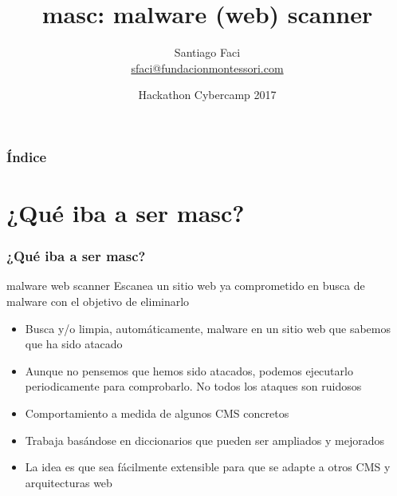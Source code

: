 \documentclass[xcolor={dvipsnames}]{beamer}
\begin{document}
\title{masc: malware (web) scanner}  
\author{Santiago Faci\\ \url{sfaci@fundacionmontessori.com}}
\date{\Large{Hackathon Cybercamp 2017}} 

\begin{frame}
\titlepage
\end{frame}

\begin{frame}[plain]\frametitle{Índice}\tableofcontents
\end{frame} 


\section{¿Qué iba a ser masc?} 
\begin{frame}\frametitle{¿Qué iba a ser masc?} 

    \begin{block}{malware web scanner}
    Escanea un sitio web ya comprometido en busca de malware con el objetivo de eliminarlo
    \end{block}

    \begin{itemize}
        \item Busca y/o limpia, automáticamente, malware en un sitio web que sabemos que ha sido atacado
        \item Aunque no pensemos que hemos sido atacados, podemos ejecutarlo periodicamente para comprobarlo. No todos los ataques son ruidosos
        \item Comportamiento a medida de algunos CMS concretos
        \item Trabaja basándose en diccionarios que pueden ser ampliados y mejorados
        \item La idea es que sea fácilmente extensible para que se adapte a otros CMS y arquitecturas web
    \end{itemize}
\end{frame}
\end{document}
